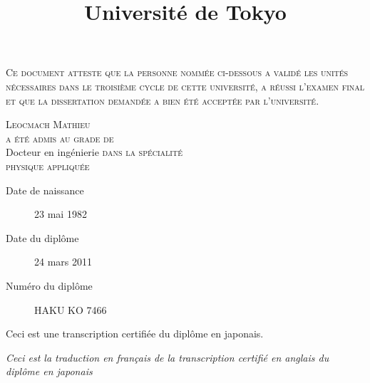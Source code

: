 \documentclass[12pt,a4paper]{article}
\title{Université de Tokyo}
\date{}
\begin{document}

\maketitle
\thispagestyle{empty}
\begin{center}

\textsc{Ce document atteste que la personne nommée ci-dessous a validé les unités nécessaires dans le troisième cycle de cette université, a réussi l'examen final et que la dissertation demandée a bien été acceptée par l'université.}

\bigskip

\textsc{Leocmach Mathieu\\
a été admis au grade de\\}
Docteur en ingénierie
\textsc{dans la spécialité\\
physique appliquée}
\end{center}

\bigskip

\begin{description}
\item[Date de naissance] 23 mai 1982
\item[Date du diplôme] 24 mars 2011
\item[Numéro du diplôme] HAKU KO 7466
\end{description}

\bigskip

Ceci est une transcription certifiée du diplôme en japonais.

\textit{Ceci est la traduction en français de la transcription certifié en anglais du diplôme en japonais}
\end{document}
